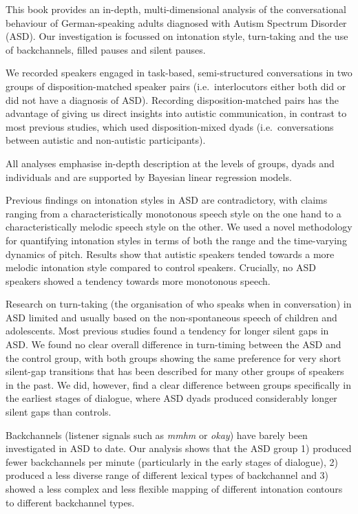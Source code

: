 \addchap{\lsAbstract} 

This book provides an in-depth, multi-dimensional analysis of the conversational behaviour of German-speaking adults diagnosed with Autism Spectrum Disorder (ASD). Our investigation is focussed on intonation style, turn-taking and the use of backchannels, filled pauses and silent pauses.

We recorded speakers engaged in task-based, semi-structured conversations in two groups of disposition-matched speaker pairs (i.e.~interlocutors either both did or did not have a diagnosis of ASD). Recording disposition-matched pairs has the advantage of giving us direct insights into autistic communication, in contrast to most previous studies, which used disposition-mixed dyads (i.e.~conversations between autistic and non-autistic participants).

All analyses emphasise in-depth description at the levels of groups, dyads and individuals and are supported by Bayesian linear regression models.

Previous findings on intonation styles in ASD are contradictory, with claims ranging from a characteristically monotonous speech style on the one hand to a characteristically melodic speech style on the other. We used a novel methodology for quantifying intonation styles in terms of both the range and the time-varying dynamics of pitch. Results show that autistic speakers tended towards a more melodic intonation style compared to control speakers. Crucially, no ASD speakers showed a tendency towards more monotonous speech.

Research on turn-taking (the organisation of who speaks when in conversation) in ASD limited and usually based on the non-spontaneous speech of children and adolescents. Most previous studies found a tendency for longer silent gaps in ASD. We found no clear overall difference in turn-timing between the ASD and the control group, with both groups showing the same preference for very short silent-gap transitions that has been described for many other groups of speakers in the past. We did, however, find a clear difference between groups specifically in the earliest stages of dialogue, where ASD dyads produced considerably longer silent gaps than controls.

Backchannels (listener signals such as \emph{mmhm} or \emph{okay}) have barely been investigated in ASD to date. Our analysis shows that the ASD group 1) produced fewer backchannels per minute (particularly in the early stages of dialogue), 2) produced a less diverse range of different lexical types of backchannel and 3) showed a less complex and less flexible mapping of different intonation contours to different backchannel types.

